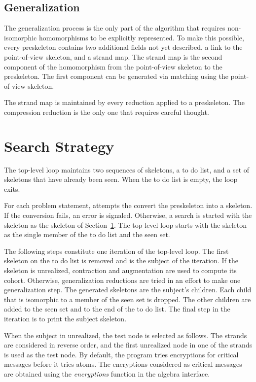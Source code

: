 \documentclass[12pt]{report}
\theoremstyle{definition}
\begin{document}
\section{Generalization}\label{sec:generalization}

The generalization process is the only part of the algorithm that
requires non-isomorphic homomorphisms to be explicitly represented.
To make this possible, every preskeleton contains two additional
fields not yet described, a link to the point-of-view skeleton, and a
{\pov} strand map.  The {\pov} strand map is the second component of
the homomorphism from the point-of-view skeleton to the preskeleton.
The first component can be generated via matching using the
point-of-view skeleton.

The {\pov} strand map is maintained by every reduction applied to a
preskeleton.  The compression reduction is the only one that
requires careful thought.

\chapter{Search Strategy}\label{cha:search}

The top-level loop maintains two sequences of skeletons, a to do list,
and a set of skeletons that have already been seen.  When the to do
list is empty, the loop exits.

For each problem statement, {\cpsa} attempts the convert the
preskeleton into a skeleton.  If the conversion fails, an error is
signaled.  Otherwise, a search is started with the skeleton as the
{\pov} skeleton of Section~\ref{sec:generalization}.  The top-level loop
starts with the {\pov} skeleton as the single member of the to do
list and the seen set.

The following steps constitute one iteration of the top-level loop.
The first skeleton on the to do list is removed and is the subject of
the iteration.  If the skeleton is unrealized, contraction and
augmentation are used to compute its cohort.  Otherwise, generalization
reductions are tried in an effort to make one generalization step.
The generated skeletons are the subject's children.  Each child that
is isomorphic to a member of the seen set is dropped.  The other
children are added to the seen set and to the end of the to do list.
The final step in the iteration is to print the subject skeleton.

When the subject in unrealized, the test node is selected as follows.
The strands are considered in reverse order, and the first unrealized
node in one of the strands is used as the test node.  By default, the
program tries encryptions for critical messages before it tries atoms.
The encryptions considered as critical messages are obtained using the
\emph{encryptions} function in the algebra interface.
\end{document}
